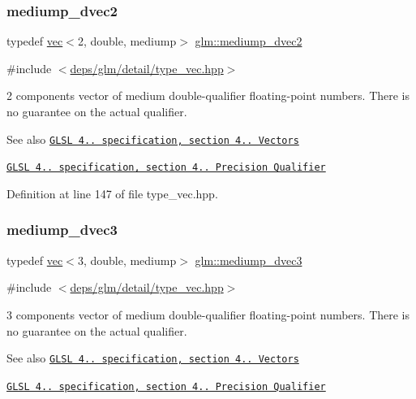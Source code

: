 \subsubsection{\texorpdfstring{mediump\+\_\+dvec2}{mediump\_dvec2}}
{\footnotesize\ttfamily typedef \hyperlink{structglm_1_1vec}{vec}$<$2, double, mediump$>$ \hyperlink{group__core__precision_ga71307e1aa231cbc5d9de712a92714496}{glm\+::mediump\+\_\+dvec2}}



{\ttfamily \#include $<$\hyperlink{type__vec_8hpp}{deps/glm/detail/type\+\_\+vec.\+hpp}$>$}

2 components vector of medium double-\/qualifier floating-\/point numbers. There is no guarantee on the actual qualifier.

\begin{DoxySeeAlso}{See also}
\href{http://www.opengl.org/registry/doc/GLSLangSpec.4.20.8.pdf}{\tt G\+L\+SL 4.. specification, section 4.. Vectors} 

\href{http://www.opengl.org/registry/doc/GLSLangSpec.4.20.8.pdf}{\tt G\+L\+SL 4.. specification, section 4.. Precision Qualifier} 
\end{DoxySeeAlso}


Definition at line 147 of file type\+\_\+vec.\+hpp.

\mbox{\label{group__core__precision_ga11d5fecb18f3d7e5f7add0663a8d7d3f}} 
\subsubsection{\texorpdfstring{mediump\+\_\+dvec3}{mediump\_dvec3}}
{\footnotesize\ttfamily typedef \hyperlink{structglm_1_1vec}{vec}$<$3, double, mediump$>$ \hyperlink{group__core__precision_ga11d5fecb18f3d7e5f7add0663a8d7d3f}{glm\+::mediump\+\_\+dvec3}}



{\ttfamily \#include $<$\hyperlink{type__vec_8hpp}{deps/glm/detail/type\+\_\+vec.\+hpp}$>$}

3 components vector of medium double-\/qualifier floating-\/point numbers. There is no guarantee on the actual qualifier.

\begin{DoxySeeAlso}{See also}
\href{http://www.opengl.org/registry/doc/GLSLangSpec.4.20.8.pdf}{\tt G\+L\+SL 4.. specification, section 4.. Vectors} 

\href{http://www.opengl.org/registry/doc/GLSLangSpec.4.20.8.pdf}{\tt G\+L\+SL 4.. specification, section 4.. Precision Qualifier} 
\end{DoxySeeAlso}


